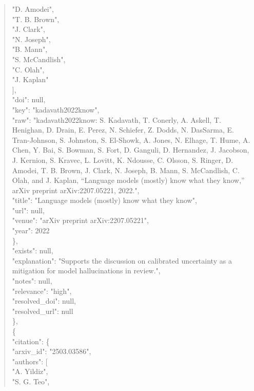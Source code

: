 \documentclass[11pt]{article}
\begin{document}
\begin{quote}
          "D. Amodei",\\
          "T. B. Brown",\\
          "J. Clark",\\
          "N. Joseph",\\
          "B. Mann",\\
          "S. McCandlish",\\
          "C. Olah",\\
          "J. Kaplan"\\
        ],\\
        "doi": null,\\
        "key": "kadavath2022know",\\
        "raw": "kadavath2022know: S. Kadavath, T. Conerly, A. Askell, T. Henighan, D. Drain, E. Perez, N. Schiefer, Z. Dodds, N. DasSarma, E. Tran-Johnson, S. Johnston, S. El-Showk, A. Jones, N. Elhage, T. Hume, A. Chen, Y. Bai, S. Bowman, S. Fort, D. Ganguli, D. Hernandez, J. Jacobson, J. Kernion, S. Kravec, L. Lovitt, K. Ndousse, C. Olsson, S. Ringer, D. Amodei, T. B. Brown, J. Clark, N. Joseph, B. Mann, S. McCandlish, C. Olah, and J. Kaplan, ``Language models (mostly) know what they know,'' arXiv preprint arXiv:2207.05221, 2022.",\\
        "title": "Language models (mostly) know what they know",\\
        "url": null,\\
        "venue": "arXiv preprint arXiv:2207.05221",\\
        "year": 2022\\
      \},\\
      "exists": null,\\
      "explanation": "Supports the discussion on calibrated uncertainty as a mitigation for model hallucinations in review.",\\
      "notes": null,\\
      "relevance": "high",\\
      "resolved\_doi": null,\\
      "resolved\_url": null\\
    \},\\
    \{\\
      "citation": \{\\
        "arxiv\_id": "2503.03586",\\
        "authors": [\\
          "A. Yildiz",\\
          "S. G. Teo",\\

\end{quote}
\end{document}

